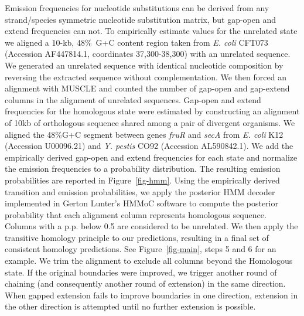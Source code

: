 \documentclass{llncs}
\begin{document}
\begin{comment}
Taking  A G pair for example, we have
pi_A * exp{Q(A,G)t} + pi_G*exp{Q(G,A)t}  but since the substitution
process is reversible, Q(A,G)=Q(G,A) and so we're left with
(pi_A+pi_G)*exp{Q(A,G)t}.  So the thing to do here is divide by the
original pi_A+pi_G and multiply by the new pi_A+pi_G.  For the HOXD the
original pi_A+pi_G is 0.525/2 + 0.475/2 = 0.2625+0.2375 = 0.5.  And
indeed, by definition, the new pi_A+pi_G is also 0.5!  So we don't have
to do anything with those values.

I suppose a similar problem arises in the A->T mutations (also T->A, G-
>C, C->G).  for those we're looking at pi_A * exp{Q(A,T)t} + pi_T*exp{Q
(T,A)t}.  which reduces to (pi_A+pi_T)*exp{Q(A,T)t}.  Where pi_A+pi_T =
0.525 in the original HOXD data, and so we will want to compute it for
the new data and adjust emissions accordingly (by dividing old and
multiplying new, pre-gap-normalization.
\end{comment}

Emission frequencies for nucleotide substitutions can be derived from
any strand/species symmetric nucleotide substitution matrix, but gap-open
and extend frequencies can not.  To empirically estimate values
for the unrelated state we aligned a 10-kb, 48\%~G+C content region
taken from \emph{E. coli} CFT073 (Accession AF447814.1, coordinates
37,300-38,300) with an unrelated sequence.  We generated an unrelated
sequence with identical nucleotide composition by reversing the
extracted sequence without complementation.  We then forced an
alignment with MUSCLE and counted the number of gap-open and gap-extend
columns in the alignment of unrelated sequences.  Gap-open and
extend frequencies for the homologous state were estimated by
constructing an alignment of 10kb of orthologous sequence shared among
a pair of divergent organisms.  We aligned the 48\%G+C segment between
genes \textit{fruR} and \textit{secA} from \textit{E. coli} K12
(Accession U00096.21) and \emph{Y. pestis} CO92 (Accession
AL590842.1). We add the empirically derived gap-open and extend
frequencies for each state and normalize the emission frequencies to a
probability distribution.  The resulting emission probabilities are
reported in Figure~\ref{fig-hmm}. Using the empirically derived transition and emission probabilities,
we apply the posterior HMM decoder implemented in Gerton Lunter's
HMMoC software\cite{Lunter2007} to compute the posterior probability that
each alignment column represents homologous sequence.  Columns with a
p.p. below 0.5 are considered to be unrelated.  We then apply the
transitive homology principle to our predictions, resulting in a final
set of consistent homology predictions.  See Figure~\ref{fig-main},
steps 5 and 6 for an example. We trim the alignment to exclude all
columns beyond the Homologous state. If the original boundaries were
improved, we trigger another round of chaining (and consequently
another round of extension) in the same direction.
When gapped extension fails to improve boundaries
in one direction, extension in the other direction is attempted until
no further extension is possible.
\end{document}
